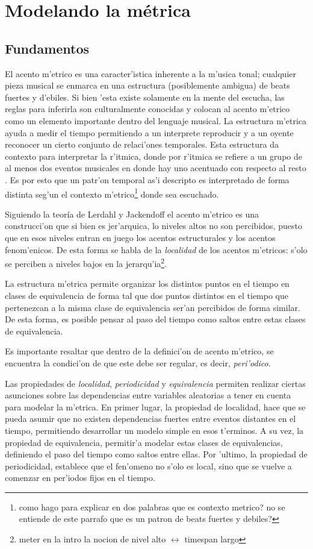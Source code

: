 \section{Modelando la m\'etrica}
\label{sec:metric_model}
\subsection{Fundamentos}
El acento m'etrico es una caracter'istica inherente a la m'usica tonal; cualquier pieza musical se enmarca en una estructura 
(posiblemente ambigua) de beats fuertes y d'ebiles. Si bien 'esta existe solamente en la mente del escucha, las reglas para inferirla son culturalmente conocidas 
y colocan al acento m'etrico como un elemento importante dentro del lenguaje musical. La estructura m'etrica ayuda a medir el tiempo permitiendo a un interprete 
reproducir y a un oyente reconocer un cierto conjunto de relaci'ones temporales. Esta estructura da contexto para interpretar la r'itmica,  
donde por r'itmica se refiere a un grupo de al menos dos eventos musicales en donde hay uno acentuado con respecto al resto \cite{CooperMeyer60}.
Es por esto que un patr'on temporal as'i descripto es interpretado de forma distinta seg'un el contexto m'etrico\footnote{como hago para explicar en dos palabras que es contexto metrico? no se entiende de este parrafo que es un patron de beats fuertes y debiles?} donde sea escuchado. 

Siguiendo la teor\'ia de Lerdahl y Jackendoff el acento m'etrico es una construcci'on que si bien es jer'arquica, lo niveles altos no son percibidos, puesto
que en esos niveles entran en juego los acentos estructurales y los acentos fenom'enicos. De esta forma se habla de la \emph{localidad} de los acentos m'etricos: 
s'olo se perciben a niveles bajos en la jerarqu'ia\footnote{meter en la intro la nocion de nivel alto $\leftrightarrow$ timespan largo}. 

La estructura m'etrica permite organizar los distintos puntos en el tiempo en clases de 
equivalencia de forma tal que dos puntos distintos en el tiempo que pertenezcan a la misma clase de equivalencia ser'an percibidos de forma similar\cite{Benjamin84}. 
De esta forma, es posible pensar al paso del tiempo como saltos entre estas clases de equivalencia.

Es importante resaltar que dentro de la definici'on de acento m'etrico, se encuentra la condici'on de que este debe ser regular, es decir, \emph{peri'odico}. 

Las propiedades de \emph{localidad}, \emph{periodicidad} y \emph{equivalencia} permiten realizar ciertas asunciones sobre las dependencias entre variables aleatorias 
a tener en cuenta para modelar la m'etrica. En primer lugar, la propiedad de localidad, hace que se pueda asumir que no existen dependencias fuertes entre eventos distantes 
en el tiempo, permitiendo desarrollar un modelo simple en esos t'erminos.  A su vez, la propiedad de equivalencia, permitir'a modelar estas clases de equivalencias, 
definiendo el paso del tiempo como saltos entre ellas. Por 'ultimo, la propiedad de periodicidad, establece que el fen'omeno no s'olo es local, 
sino que se vuelve a comenzar en per'iodos fijos en el tiempo.

